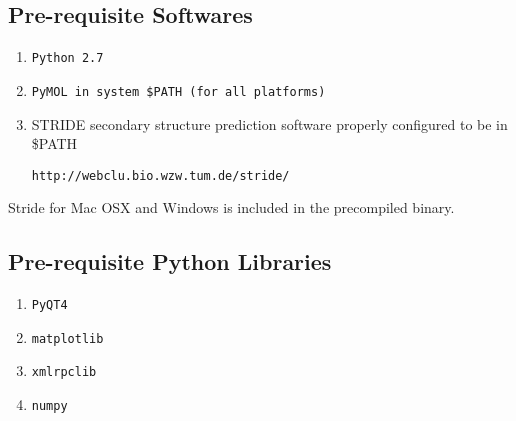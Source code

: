 \documentclass[11pt,fleqn]{book} %
\begin{document}
\subsection{Pre-requisite Softwares}

\begin{enumerate}
\item \texttt{Python 2.7}
\item \texttt{PyMOL in system \$PATH (for all platforms)}
\item STRIDE secondary structure prediction software properly configured to be in \$PATH
\begin{lstlisting}
http://webclu.bio.wzw.tum.de/stride/
\end{lstlisting}
\end{enumerate}

\begin{remark}
Stride for Mac OSX and Windows is included in the precompiled binary.
\end{remark}


\subsection{Pre-requisite Python Libraries}

\begin{enumerate}
\item \texttt{PyQT4}
\item \texttt{matplotlib}
\item \texttt{xmlrpclib}
\item \texttt{numpy}
\end{enumerate}
\end{document}
